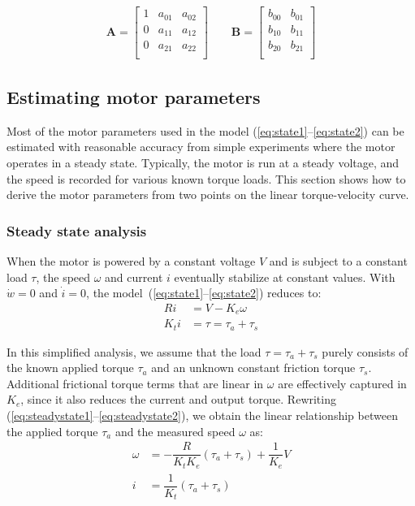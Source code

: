 \documentclass[12pt, a4paper]
{article}
\providecommand{\lr}[1]{\left(#1\right)}
\providecommand{\w}{\omega}
\providecommand{\w}{\omega}
\providecommand{\A}{\mathbf{A}}
\providecommand{\B}{\mathbf{B}}
\begin{document}
\begin{align}
    \A = 
    \begin{bmatrix}
        1 & a_{01} & a_{02}\\
        0 & a_{11} & a_{12}\\
        0 & a_{21} & a_{22}\\
    \end{bmatrix}\qquad
    \B = 
    \begin{bmatrix}
        b_{00} & b_{01}\\
        b_{10} & b_{11}\\
        b_{20} & b_{21}\\
    \end{bmatrix}
\end{align}


\subsection{Estimating motor parameters}

Most of the motor parameters used in the model
(\ref{eq:state1}--\ref{eq:state2}) can be estimated with reasonable accuracy
from simple experiments where the motor operates in a steady state. Typically,
the motor is run at a steady voltage, and the speed is recorded for various
known torque loads. This section shows how to derive the motor parameters from
two points on the linear torque-velocity curve.

\subsubsection{Steady state analysis}

When the motor is powered by a constant voltage $V$ and is subject to a
constant load $\tau$, the speed $\w$ and current $i$ eventually stabilize at
constant values. With $\dot{w}=0$ and
$\dot{i} = 0$, the model~(\ref{eq:state1}--\ref{eq:state2}) reduces to:
%
\begin{align}
    \label{eq:steadystate1}
    R i &= V - K_e\w\\[1em]
    \label{eq:steadystate2}
    K_t i &= \tau = \tau_a + \tau_s
\end{align}

In this simplified analysis, we assume that the load $\tau = \tau_a + \tau_s$
purely consists of the known applied torque $\tau_a$ and an unknown constant
friction torque $\tau_s$. Additional frictional torque terms that are linear
in $\w$ are effectively captured in $K_e$, since it also reduces the current
and output torque. Rewriting (\ref{eq:steadystate1}--\ref{eq:steadystate2}),
we obtain the linear relationship between the applied torque $\tau_a$ and the
measured speed $\w$ as:
\begin{align}
    \label{eq:steadystate3}
    \w &= - \dfrac{R}{K_t K_e} \lr{ \tau_a + \tau_s} + \dfrac{1}{K_e}V\\[1em]
    i &= \dfrac{1}{K_t} \lr{\tau_a + \tau_s}
\end{align}
\end{document}

